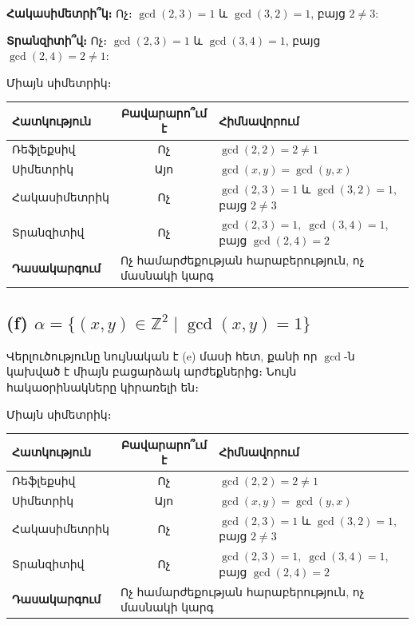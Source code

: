 \documentclass[12pt, a4paper]{article}
\newcommand{\Z}{\mathbb{Z}}
\begin{document}
\textbf{Հակասիմետրի՞կ։} Ոչ։ $\gcd(2,3) = 1$ և $\gcd(3,2) = 1$, բայց $2 \ne 3$:

\textbf{Տրանզիտի՞վ։} Ոչ։ $\gcd(2,3) = 1$ և $\gcd(3,4) = 1$, բայց $\gcd(2,4) = 2 \ne 1$:

\begin{answerbox}
Միայն սիմետրիկ։
\end{answerbox}

\begin{center}
\renewcommand{\arraystretch}{1.15}
\begin{tabular}{l|c|l}
  \toprule
  \textbf{Հատկություն} & \textbf{Բավարարո՞ւմ է} & \textbf{Հիմնավորում} \\
  \midrule
  Ռեֆլեքսիվ      & Ոչ  & $\gcd(2,2)=2\ne 1$ \\
  Սիմետրիկ      & Այո & $\gcd(x,y)=\gcd(y,x)$ \\
  Հակասիմետրիկ  & Ոչ  & $\gcd(2,3)=1$ և $\gcd(3,2)=1$, բայց $2\ne 3$ \\
  Տրանզիտիվ     & Ոչ  & $\gcd(2,3)=1,\;\gcd(3,4)=1$, բայց $\gcd(2,4)=2$ \\
  \midrule
  \textbf{Դասակարգում} & \multicolumn{2}{l}{Ոչ համարժեքության հարաբերություն, ոչ մասնակի կարգ} \\
  \bottomrule
\end{tabular}
\end{center}

\subsection*{(f)\; $\alpha = \{(x,y) \in \Z^2 \mid \gcd(x,y) = 1\}$}

Վերլուծությունը նույնական է (e) մասի հետ, քանի որ $\gcd$-ն կախված է միայն բացարձակ արժեքներից։ Նույն հակաօրինակները կիրառելի են։

\begin{answerbox}
Միայն սիմետրիկ։
\end{answerbox}

\begin{center}
\renewcommand{\arraystretch}{1.15}
\begin{tabular}{l|c|l}
  \toprule
  \textbf{Հատկություն} & \textbf{Բավարարո՞ւմ է} & \textbf{Հիմնավորում} \\
  \midrule
  Ռեֆլեքսիվ      & Ոչ  & $\gcd(2,2)=2\ne 1$ \\
  Սիմետրիկ      & Այո & $\gcd(x,y)=\gcd(y,x)$ \\
  Հակասիմետրիկ  & Ոչ  & $\gcd(2,3)=1$ և $\gcd(3,2)=1$, բայց $2\ne 3$ \\
  Տրանզիտիվ     & Ոչ  & $\gcd(2,3)=1,\;\gcd(3,4)=1$, բայց $\gcd(2,4)=2$ \\
  \midrule
  \textbf{Դասակարգում} & \multicolumn{2}{l}{Ոչ համարժեքության հարաբերություն, ոչ մասնակի կարգ} \\
  \bottomrule
\end{tabular}
\end{center}
\end{document}
